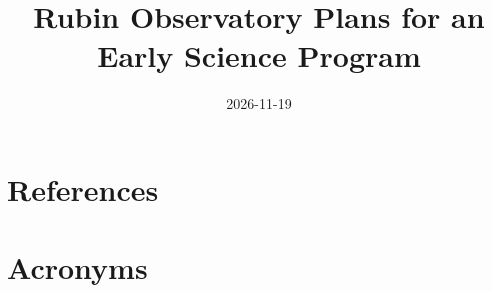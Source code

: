 \documentclass[DM,authoryear,toc]{lsstdoc}
\title{Rubin Observatory Plans for an Early Science Program}
\date{2026-11-19}
\begin{document}
\maketitle









\appendix
\section{References} \label{sec:bib}
\renewcommand{\refname}{} %


\section{Acronyms} \label{sec:acronyms}

\end{document}
